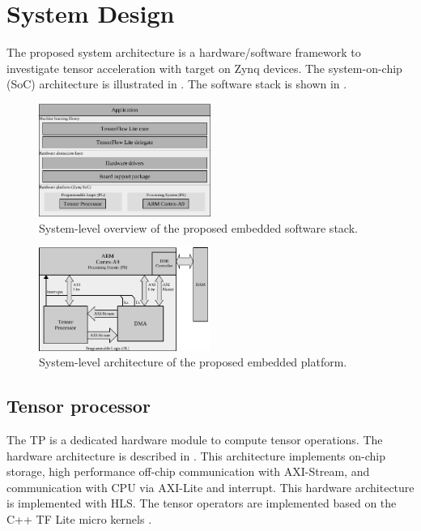\section{System Design}
\label{sec:system_design}
The proposed system architecture is a hardware/software framework to investigate tensor acceleration with target on Zynq devices. The system-on-chip (SoC) architecture is illustrated in . The software stack is shown in .

\begin{figure}[t!]
	\centering
	\includegraphics[width=0.5\textwidth]{../figures/sw_stack.pdf}
	\caption{System-level overview of the proposed embedded software stack.}
	\label{fig:sw_stack}
\end{figure}

\begin{figure}[t!]
	\centering
	\includegraphics[width=0.5\textwidth]{../figures/system_design.pdf}
	\caption{System-level architecture of the proposed embedded platform.}
	\label{fig:system_architecture}
\end{figure}

\subsection{Tensor processor}
The TP is a dedicated hardware module to compute tensor operations. The hardware architecture is described in . This architecture implements on-chip storage, high performance off-chip communication with AXI-Stream, and communication with CPU via AXI-Lite and interrupt. This hardware architecture is implemented with HLS. The tensor operators are implemented based on the C++ TF Lite micro kernels \cite{tfLiteMicro}.

